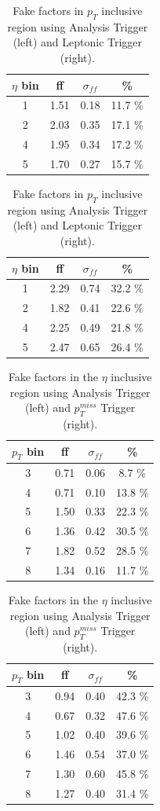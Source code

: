 \begin{table}[H]
\centering
\begin{tabular}{|c|c|c|c|}
\hline
$\eta$ bin & ff & $\sigma_{ff}$  & \% \\
\hline
 1 & 1.51 & 0.18 & 11.7 \% \\
\hline
 2 & 2.03 & 0.35 & 17.1 \% \\
\hline
 4 & 1.95 & 0.34 & 17.2 \% \\
\hline
 5 & 1.70 & 0.27 & 15.7 \% \\
\hline
\end{tabular}
\hspace{0.5cm}
\begin{tabular}{|c|c|c|c|}
\hline
$\eta$ bin & ff & $\sigma_{ff}$  & \% \\
\hline
 1 & 2.29 & 0.74 & 32.2 \% \\
\hline
 2 & 1.82 & 0.41 & 22.6 \% \\
\hline
 4 & 2.25 & 0.49 & 21.8 \% \\
\hline
 5 & 2.47 & 0.65 & 26.4 \% \\
\hline
\end{tabular}
\caption{Fake factors in $p_T$ inclusive region using Analysis Trigger (left) and Leptonic Trigger (right).}
\label{tab: ff unc 2}
\end{table}



\begin{table}[H]
\centering
\begin{tabular}{|c|c|c|c|}
\hline
$p_T$ bin & ff & $\sigma_{ff}$  & \% \\
\hline
 3 & 0.71 & 0.06 & 8.7 \% \\
\hline
 4 & 0.71 & 0.10 & 13.8 \% \\
\hline
 5 & 1.50 & 0.33 & 22.3 \% \\
\hline
 6 & 1.36 & 0.42 & 30.5 \% \\
\hline
 7 & 1.82 & 0.52 & 28.5 \% \\
\hline
 8 & 1.34 & 0.16 & 11.7 \% \\
\hline
\end{tabular}
\hspace{0.5cm}
\begin{tabular}{|c|c|c|c|}
\hline
$p_T$ bin & ff & $\sigma_{ff}$  & \% \\
\hline
 3 & 0.94 & 0.40 & 42.3 \% \\
\hline
 4 & 0.67 & 0.32 & 47.6 \% \\
\hline
 5 & 1.02 & 0.40 & 39.6 \% \\
\hline
 6 & 1.46 & 0.54 & 37.0 \% \\
\hline
 7 & 1.30 & 0.60 & 45.8 \% \\
\hline
 8 & 1.27 & 0.40 & 31.4 \% \\
\hline
\end{tabular}
\caption{Fake factors in the $\eta$ inclusive region using Analysis Trigger (left) and $p_T^{miss}$ Trigger (right).}
\label{tab: ff unc}
\end{table}




